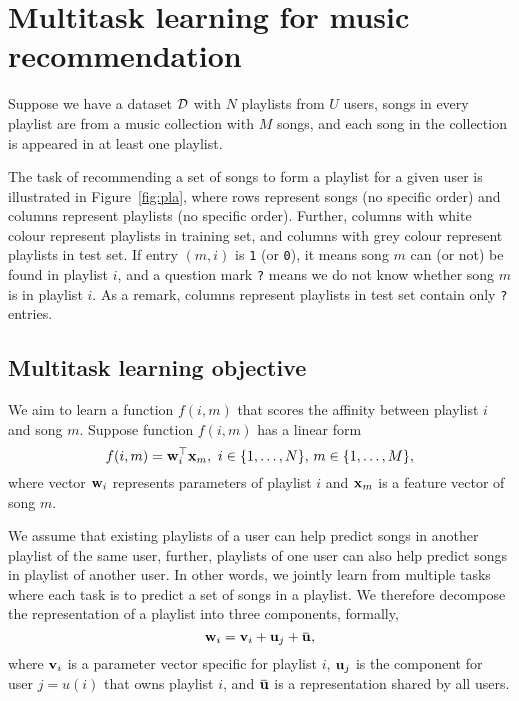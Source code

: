 \section{Multitask learning for music recommendation}
\label{sec:method}

Suppose we have a dataset $\mathcal{D}$ with $N$ playlists from $U$ users, songs in every playlist are from a music collection 
with $M$ songs, and each song in the collection is appeared in at least one playlist.

The task of recommending a set of songs to form a playlist for a given user is illustrated in Figure~\ref{fig:pla},
where rows represent songs (no specific order) and columns represent playlists (no specific order).
Further, columns with white colour represent playlists in training set, 
and columns with grey colour represent playlists in test set.
If entry $(m, i)$ is \texttt{1} (or \texttt{0}), 
it means song $m$ can (or not) be found in playlist $i$,
and a question mark \texttt{?} means we do not know whether song $m$ is in playlist $i$.
As a remark, columns represent playlists in test set contain only \texttt{?} entries.





\subsection{Multitask learning objective}

%
We aim to learn a function $f(i, m)$ that scores the affinity between playlist $i$ and song $m$.
Suppose function $f(i, m)$ has a linear form
$$
f(i, m) = \mathbf{w}_i^\top \mathbf{x}_m, \ i \in \{1,\dots,N\}, \, m \in \{1,\dots,M\},
$$
where vector $\mathbf{w}_i$ represents parameters of playlist $i$ and $\mathbf{x}_m$ is a feature vector of song $m$.

We assume that existing playlists of a user can help predict songs in another playlist of the same user,
further, playlists of one user can also help predict songs in playlist of another user.
In other words, we jointly learn from multiple tasks where each task is to predict a set of songs in a playlist.
We therefore decompose the representation of a playlist into three components, formally,
$$
\w_i = \bv_i + \bu_j + \widebar\bu,
$$
where $\mathbf{v}_i$ is a parameter vector specific for playlist $i$, 
$\mathbf{u}_j$ is the component for user $j=u(i)$ that owns playlist $i$,
and $\widebar\bu$ is a representation shared by all users.


